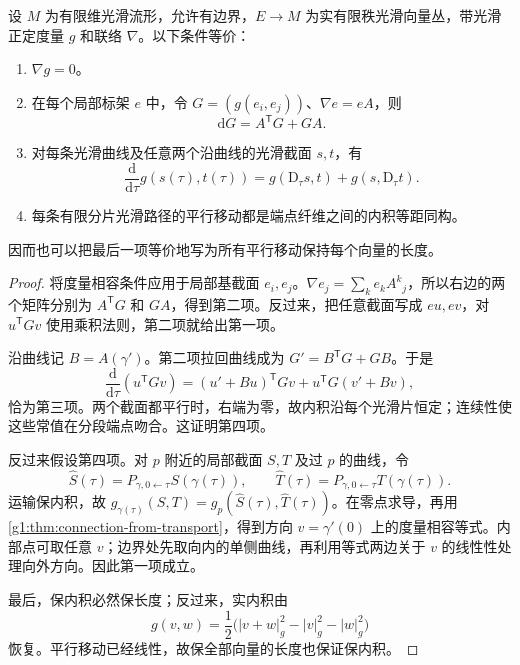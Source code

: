\begin{proposition}\label{g1:prop:metric-parallel-transport}
	设 \(M\) 为有限维光滑流形，允许有边界，\(E\to M\) 为实有限秩光滑向量丛，带光滑正定度量 \(g\) 和联络 \(\nabla\)。以下条件等价：
	\begin{enumerate}
		\item \(\nabla g=0\)。
		\item 在每个局部标架 \(e\) 中，令 \(G=(g(e_i,e_j))\)、\(\nabla e=eA\)，则
		\begin{equation}\label{g1:eq:metric-connection-matrix}
			\mathrm{d}G=A^{\mathsf T}G+GA.
		\end{equation}
		\item 对每条光滑曲线及任意两个沿曲线的光滑截面 \(s,t\)，有
		\[
			\frac{\mathrm{d}}{\mathrm{d}\tau}g(s(\tau),t(\tau))
			=g(\mathrm{D}_\tau s,t)+g(s,\mathrm{D}_\tau t).
		\]
		\item 每条有限分片光滑路径的平行移动都是端点纤维之间的内积等距同构。
	\end{enumerate}
	因而也可以把最后一项等价地写为所有平行移动保持每个向量的长度。
\end{proposition}
\begin{proof}
	将度量相容条件应用于局部基截面 \(e_i,e_j\)。\(\nabla e_j=\sum_k e_kA^k{}_j\)，所以右边的两个矩阵分别为 \(A^{\mathsf T}G\) 和 \(GA\)，得到第二项。反过来，把任意截面写成 \(eu,ev\)，对 \(u^{\mathsf T}Gv\) 使用乘积法则，第二项就给出第一项。

	沿曲线记 \(B=A(\gamma')\)。第二项拉回曲线成为 \(G'=B^{\mathsf T}G+GB\)。于是
	\[
		\frac{\mathrm{d}}{\mathrm{d}\tau}(u^{\mathsf T}Gv)
		=(u'+Bu)^{\mathsf T}Gv+u^{\mathsf T}G(v'+Bv),
	\]
	恰为第三项。两个截面都平行时，右端为零，故内积沿每个光滑片恒定；连续性使这些常值在分段端点吻合。这证明第四项。

	反过来假设第四项。对 \(p\) 附近的局部截面 \(S,T\) 及过 \(p\) 的曲线，令
	\[
		\widehat S(\tau)=P_{\gamma,0\leftarrow\tau}S(\gamma(\tau)),\qquad
		\widehat T(\tau)=P_{\gamma,0\leftarrow\tau}T(\gamma(\tau)).
	\]
	运输保内积，故 \(g_{\gamma(\tau)}(S,T)=g_p(\widehat S(\tau),\widehat T(\tau))\)。在零点求导，再用\cref{g1:thm:connection-from-transport}，得到方向 \(v=\gamma'(0)\) 上的度量相容等式。内部点可取任意 \(v\)；边界处先取向内的单侧曲线，再利用等式两边关于 \(v\) 的线性性处理向外方向。因此第一项成立。

	最后，保内积必然保长度；反过来，实内积由
	\[
		g(v,w)=\frac12\bigl(|v+w|_g^2-|v|_g^2-|w|_g^2\bigr)
	\]
	恢复。平行移动已经线性，故保全部向量的长度也保证保内积。
\end{proof}

